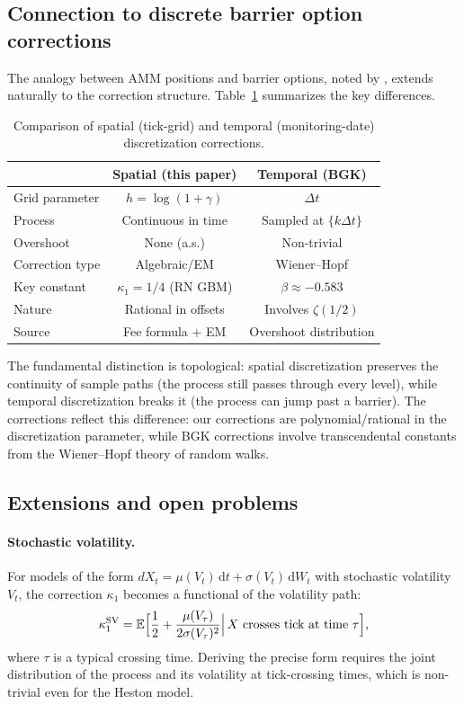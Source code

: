 \documentclass[11pt]{article}
\theoremstyle{definition}
\theoremstyle{remark}
\newcommand{\E}{\mathbb{E}}
\newcommand{\dd}{\,\mathrm{d}}
\begin{document}
\subsection{Connection to discrete barrier option corrections}

The analogy between AMM positions and barrier options, noted by
\citet{Paone2025}, extends naturally to the correction structure.
Table~\ref{tab:bgk_comparison} summarizes the key differences.

\begin{table}[h]
\centering
\caption{Comparison of spatial (tick-grid) and temporal
(monitoring-date) discretization corrections.}
\label{tab:bgk_comparison}
\begin{tabular}{lcc}
\toprule
& \textbf{Spatial (this paper)} & \textbf{Temporal (BGK)} \\
\midrule
Grid parameter & $h = \log(1+\gamma)$ & $\Delta t$ \\
Process & Continuous in time & Sampled at $\{k\Delta t\}$ \\
Overshoot & None (a.s.) & Non-trivial \\
Correction type & Algebraic/EM & Wiener--Hopf \\
Key constant & $\kappa_1 = 1/4$ (RN GBM) & $\beta \approx -0.583$ \\
Nature & Rational in offsets & Involves $\zeta(1/2)$ \\
Source & Fee formula + EM & Overshoot distribution \\
\bottomrule
\end{tabular}
\end{table}

The fundamental distinction is topological: spatial discretization
preserves the continuity of sample paths (the process still passes
through every level), while temporal discretization breaks it (the
process can jump past a barrier). The corrections reflect this
difference: our corrections are polynomial/rational in the
discretization parameter, while BGK corrections involve
transcendental constants from the Wiener--Hopf theory of random
walks.

\subsection{Extensions and open problems}

\paragraph{Stochastic volatility.}
For models of the form $dX_t = \mu(V_t)\dd t + \sigma(V_t)\dd W_t$
with stochastic volatility $V_t$, the correction $\kappa_1$ becomes
a functional of the volatility path:
\[
\kappa_1^{\mathrm{SV}}
= \E\Bigl[\frac{1}{2} + \frac{\mu(V_\tau)}{2\sigma(V_\tau)^2}
\Bigl|\, X \text{ crosses tick at time } \tau\Bigr],
\]
where $\tau$ is a typical crossing time. Deriving the precise form
requires the joint distribution of the process and its volatility at
tick-crossing times, which is non-trivial even for the Heston model.
\end{document}
